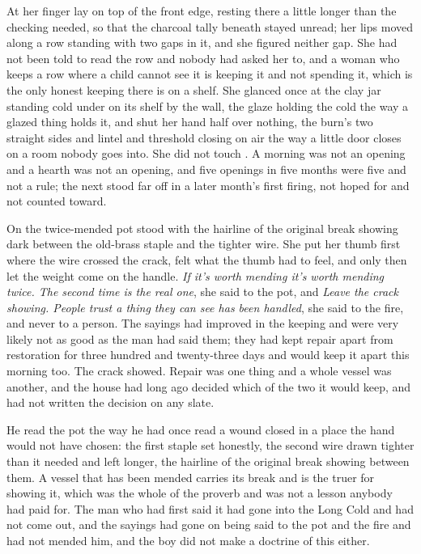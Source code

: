 At  her finger lay on top of the front edge, resting there a little longer than the checking needed, so that the charcoal tally beneath stayed unread; her lips moved along a row standing with two gaps in it, and she figured neither gap. She had not been told to read the row and nobody had asked her to, and a woman who keeps a row where a child cannot see it is keeping it and not spending it, which is the only honest keeping there is on a shelf. She glanced once at the clay jar standing cold under  on its shelf by the wall, the glaze holding the cold the way a glazed thing holds it, and shut her hand half over nothing, the burn's two straight sides and lintel and threshold closing on air the way a little door closes on a room nobody goes into. She did not touch . A morning was not an opening and a hearth was not an opening, and five openings in five months were five and not a rule; the next stood far off in a later month's first firing, not hoped for and not counted toward.

On  the twice-mended pot stood with the hairline of the original break showing dark between the old-brass staple and the tighter wire. She put her thumb first where the wire crossed the crack, felt what the thumb had to feel, and only then let the weight come on the handle. \emph{If it's worth mending it's worth mending twice. The second time is the real one}, she said to the pot, and \emph{Leave the crack showing. People trust a thing they can see has been handled}, she said to the fire, and never to a person. The sayings had improved in the keeping and were very likely not as good as the man had said them; they had kept repair apart from restoration for three hundred and twenty-three days and would keep it apart this morning too. The crack showed. Repair was one thing and a whole vessel was another, and the house had long ago decided which of the two it would keep, and had not written the decision on any slate.

He read the pot the way he had once read a wound closed in a place the hand would not have chosen: the first staple set honestly, the second wire drawn tighter than it needed and left longer, the hairline of the original break showing between them. A vessel that has been mended carries its break and is the truer for showing it, which was the whole of the proverb and was not a lesson anybody had paid for. The man who had first said it had gone into the Long Cold and had not come out, and the sayings had gone on being said to the pot and the fire and had not mended him, and the boy did not make a doctrine of this either.

